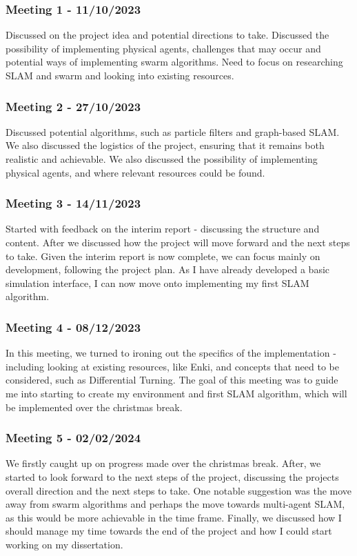 \documentclass[12pt]{article}
\begin{document}
\subsubsection{Meeting 1 - 11/10/2023}
Discussed on the project idea and potential directions to take. Discussed the possibility of implementing physical agents,
challenges that may occur and potential ways of implementing swarm algorithms. Need to focus on researching SLAM and swarm
and looking into existing resources.
\subsubsection{Meeting 2 - 27/10/2023}
Discussed potential algorithms, such as particle filters and graph-based SLAM. We also discussed the logistics of the project,
ensuring that it remains both realistic and achievable. We also discussed the possibility of implementing physical agents,
and where relevant resources could be found.
\subsubsection{Meeting 3 - 14/11/2023}
Started with feedback on the interim report - discussing the structure and content. After we discussed how the project will
move forward and the next steps to take. Given the interim report is now complete, we can focus mainly on development, following
the project plan. As I have already developed a basic simulation interface, I can now move onto implementing my first SLAM algorithm.
\subsubsection{Meeting 4 - 08/12/2023}
In this meeting, we turned to ironing out the specifics of the implementation - including looking at existing resources, like
Enki, and concepts that need to be considered, such as Differential Turning. The goal of this meeting was to guide me into
starting to create my environment and first SLAM algorithm, which will be implemented over the christmas break.
\subsubsection{Meeting 5 - 02/02/2024}
We firstly caught up on progress made over the christmas break. After, we started to look forward to the next steps of the project,
discussing the projects overall direction and the next steps to take. One notable suggestion was the move away from swarm algorithms
and perhaps the move towards multi-agent SLAM, as this would be more achievable in the time frame. Finally, we discussed how I
should manage my time towards the end of the project and how I could start working on my dissertation.
\end{document}
